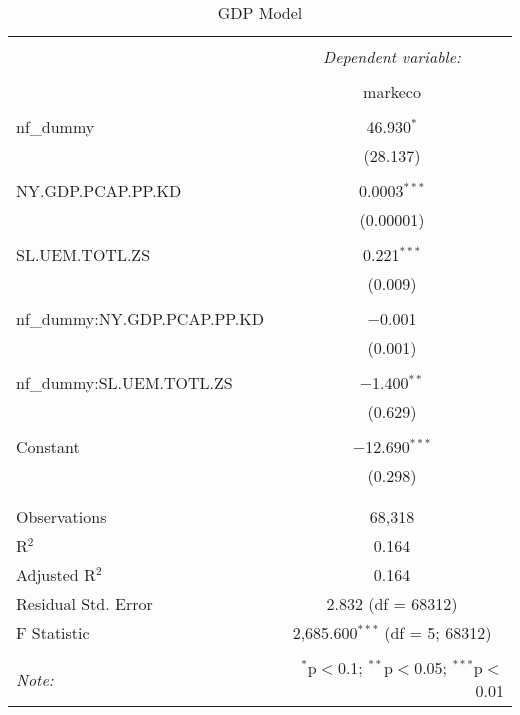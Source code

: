 
\begin{table}[!htbp] \centering 
  \caption{GDP Model} 
  \label{} 
\begin{tabular}{@{\extracolsep{5pt}}lc} 
\\[-1.8ex]\hline 
\hline \\[-1.8ex] 
 & \multicolumn{1}{c}{\textit{Dependent variable:}} \\ 
\cline{2-2} 
\\[-1.8ex] & markeco \\ 
\hline \\[-1.8ex] 
 nf\_dummy & 46.930$^{*}$ \\ 
  & (28.137) \\ 
  & \\ 
 NY.GDP.PCAP.PP.KD & 0.0003$^{***}$ \\ 
  & (0.00001) \\ 
  & \\ 
 SL.UEM.TOTL.ZS & 0.221$^{***}$ \\ 
  & (0.009) \\ 
  & \\ 
 nf\_dummy:NY.GDP.PCAP.PP.KD & $-$0.001 \\ 
  & (0.001) \\ 
  & \\ 
 nf\_dummy:SL.UEM.TOTL.ZS & $-$1.400$^{**}$ \\ 
  & (0.629) \\ 
  & \\ 
 Constant & $-$12.690$^{***}$ \\ 
  & (0.298) \\ 
  & \\ 
\hline \\[-1.8ex] 
Observations & 68,318 \\ 
R$^{2}$ & 0.164 \\ 
Adjusted R$^{2}$ & 0.164 \\ 
Residual Std. Error & 2.832 (df = 68312) \\ 
F Statistic & 2,685.600$^{***}$ (df = 5; 68312) \\ 
\hline 
\hline \\[-1.8ex] 
\textit{Note:}  & \multicolumn{1}{r}{$^{*}$p$<$0.1; $^{**}$p$<$0.05; $^{***}$p$<$0.01} \\ 
\end{tabular} 
\end{table} 
